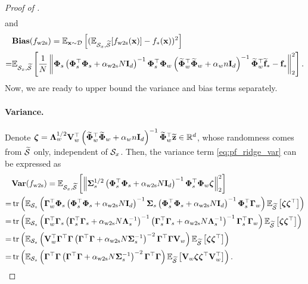\begin{proof}[Proof of ]
\begin{align}
    \end{align}
    and
    \begin{align}\label{eq:pf_ridge_bias}
    \begin{split}
        &\bias(f_\wts) = \E_{\xb \sim \Dcal}\sbr{(\E_{\Scal_x, \wt\Scal}[f_\wts(\xb)] - f_*(\xb))^2} \\
        = &\E_{\Scal_x, \wt\Scal}\sbr{\frac{1}{N} \nbr{\Phib_s \rbr{\Phib_s^\top \Phib_s + \alpha_\wts N \Ib_d}^{-1} \Phib_s^\top \Phib_w \rbr{\wt\Phib_w^\top \wt\Phib_w + \alpha_w n \Ib_d}^{-1} \wt\Phib_w^\top \wt\fb_* - \fb_*}_2^2}.
    \end{split}
    \end{align}
    Now, we are ready to upper bound the variance and bias terms separately.

    \paragraph{Variance.}
    Denote $\zetab = \Lambdab_w^{1/2} \Vb_w^\top \rbr{\wt\Phib_w^\top \wt\Phib_w + \alpha_w n \Ib_d}^{-1} \wt\Phib_w^\top \wt\zb \in \R^d$, whose randomness comes from $\wt\Scal$ only, independent of $\Scal_x$.
    Then, the variance term \eqref{eq:pf_ridge_var} can be expressed as
    \begin{align*}
        &\vari(f_\wts) = \E_{\Scal_x, \wt\Scal}\sbr{\nbr{\Sigmab_s^{1/2} \rbr{\Phib_s^\top \Phib_s + \alpha_\wts N \Ib_d}^{-1} \Phib_s^\top \Phib_w \zetab}_2^2} \\
        = &\tr\rbr{\E_{\Scal_s}\rbr{\Gammab_w^\top \Phib_s \rbr{\Phib_s^\top \Phib_s + \alpha_\wts N \Ib_d}^{-1} \Sigmab_s \rbr{\Phib_s^\top \Phib_s + \alpha_\wts N \Ib_d}^{-1} \Phib_s^\top \Gammab_w} \E_{\wt\Scal}\sbr{\zetab \zetab^\top}} \\
        = &\tr\rbr{\E_{\Scal_s}\rbr{\Gammab_w^\top \Gammab_s \rbr{\Gammab_s^\top \Gammab_s + \alpha_\wts N \Lambdab_s^{-1}}^{-1} \rbr{\Gammab_s^\top \Gammab_s + \alpha_\wts N \Lambdab_s^{-1}}^{-1} \Gammab_s^\top \Gammab_w} \E_{\wt\Scal}\sbr{\zetab \zetab^\top}} \\
        = &\tr\rbr{\E_{\Scal_s}\rbr{\Vb_w^\top \Gammab^\top \Gammab \rbr{\Gammab^\top \Gammab + \alpha_\wts N \Sigmab_s^{-1}}^{-2} \Gammab^\top \Gammab \Vb_w} \E_{\wt\Scal}\sbr{\zetab \zetab^\top}} \\
        = &\tr\rbr{\E_{\Scal_s}\rbr{\Gammab^\top \Gammab \rbr{\Gammab^\top \Gammab + \alpha_\wts N \Sigmab_s^{-1}}^{-2} \Gammab^\top \Gammab} \E_{\wt\Scal}\sbr{\Vb_w \zetab \zetab^\top \Vb_w^\top}}.
    \end{align*}

\end{proof}
